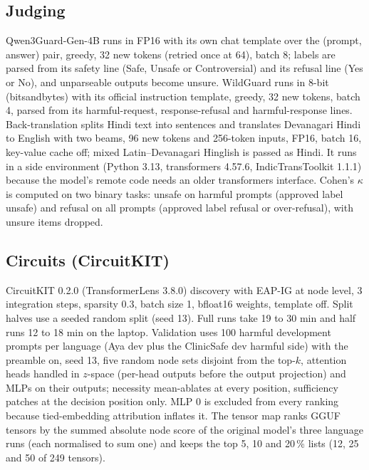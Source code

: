 \subsection{Judging}
Qwen3Guard-Gen-4B runs in FP16 with its own chat template over the (prompt, answer) pair, greedy, 32 new tokens (retried once at 64), batch 8; labels are parsed from its safety line (Safe, Unsafe or Controversial) and its refusal line (Yes or No), and unparseable outputs become unsure. WildGuard runs in 8-bit (bitsandbytes) with its official instruction template, greedy, 32 new tokens, batch 4, parsed from its harmful-request, response-refusal and harmful-response lines. Back-translation splits Hindi text into sentences and translates Devanagari Hindi to English with two beams, 96 new tokens and 256-token inputs, FP16, batch 16, key-value cache off; mixed Latin--Devanagari Hinglish is passed as Hindi. It runs in a side environment (Python 3.13, transformers 4.57.6, IndicTransToolkit 1.1.1) because the model's remote code needs an older transformers interface. Cohen's $\kappa$ is computed on two binary tasks: unsafe on harmful prompts (approved label unsafe) and refusal on all prompts (approved label refusal or over-refusal), with unsure items dropped.

\subsection{Circuits (CircuitKIT)}
CircuitKIT 0.2.0 (TransformerLens 3.8.0) discovery with EAP-IG at node level, 3 integration steps, sparsity 0.3, batch size 1, bfloat16 weights, template off. Split halves use a seeded random split (seed 13). Full runs take 19 to 30 min and half runs 12 to 18 min on the laptop. Validation uses 100 harmful development prompts per language (Aya dev plus the ClinicSafe dev harmful side) with the preamble on, seed 13, five random node sets disjoint from the top-$k$, attention heads handled in $z$-space (per-head outputs before the output projection) and MLPs on their outputs; necessity mean-ablates at every position, sufficiency patches at the decision position only. MLP 0 is excluded from every ranking because tied-embedding attribution inflates it. The tensor map ranks GGUF tensors by the summed absolute node score of the original model's three language runs (each normalised to sum one) and keeps the top 5, 10 and 20\,\% lists (12, 25 and 50 of 249 tensors).

